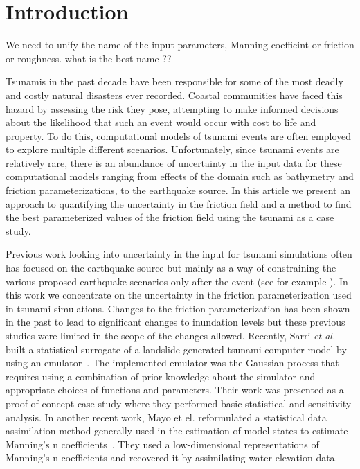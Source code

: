 
\section{Introduction}
\alert{We need to unify the name of the input parameters, Manning coefficint or friction or roughness.
what is the best name ??}

Tsunamis in the past decade have been responsible for some of the most deadly and costly natural disasters ever recorded.  Coastal communities have faced this hazard by assessing the risk they pose, attempting to make informed decisions about the likelihood that such an event would occur with cost to life and property.  To do this, computational models of tsunami events are often employed to explore multiple different scenarios.  Unfortunately, since tsunami events are relatively rare, there is an abundance of uncertainty in the input data for these computational models ranging from effects of the domain such as bathymetry and friction parameterizations, to the earthquake source.  In this article we present an approach to quantifying the uncertainty in the friction field and a method to find the best parameterized values of the friction field using the \tohoku tsunami as a case study.

Previous work looking into uncertainty in the input for tsunami simulations often has focused on the earthquake source but mainly as a way of constraining the various proposed earthquake scenarios only after the event (see for example \cite{MacInnes:2013cr}).  In this work we concentrate on the uncertainty in the friction parameterization used in tsunami simulations.  Changes to the friction parameterization has been shown in the past to lead to significant changes to inundation levels \cite{Myers:2001el,Jakeman:2010hk} but these previous studies were limited in the scope of the changes allowed.  Recently, Sarri \emph{et al.} built a statistical surrogate of a landslide-generated tsunami computer model by using an emulator~\cite{Sarri2012}. The implemented emulator was the Gaussian process
that requires using a combination of prior knowledge about the simulator and
appropriate choices of functions and parameters. Their work was presented as a proof-of-concept case study
where they performed basic statistical and sensitivity analysis.
In another recent work, Mayo et el. reformulated a statistical data assimilation method generally used in the estimation of model states to estimate Manning’s n coefficients~\cite{Mayo2013}. 
They used a low-dimensional representations of Manning’s n coefficients and recovered it by assimilating
water elevation data.

